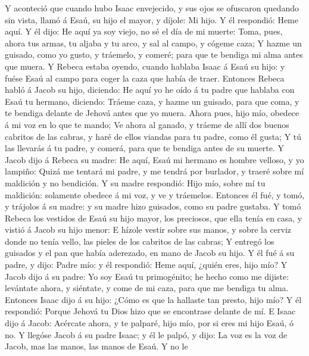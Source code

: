  Y aconteció que cuando hubo Isaac envejecido, y sus ojos se
ofuscaron quedando sin vista, llamó á Esaú, su hijo el mayor, y díjole:
Mi hijo. Y él respondió: Heme aquí.  Y él dijo: He aquí ya
soy viejo, no sé el día de mi muerte:  Toma, pues, ahora tus
armas, tu aljaba y tu arco, y sal al campo, y cógeme caza; 
Y hazme un guisado, como yo gusto, y tráemelo, y comeré; para que te
bendiga mi alma antes que muera.  Y Rebeca estaba oyendo,
cuando hablaba Isaac á Esaú su hijo: y fuése Esaú al campo para coger la
caza que había de traer.  Entonces Rebeca habló á Jacob su
hijo, diciendo: He aquí yo he oído á tu padre que hablaba con Esaú tu
hermano, diciendo:  Tráeme caza, y hazme un guisado, para
que coma, y te bendiga delante de Jehová antes que yo muera.
 Ahora pues, hijo mío, obedece á mi voz en lo que te mando;
 Ve ahora al ganado, y tráeme de allí dos buenos cabritos de
las cabras, y haré de ellos viandas para tu padre, como él gusta;
 Y tú las llevarás á tu padre, y comerá, para que te
bendiga antes de su muerte.  Y Jacob dijo á Rebeca su
madre: He aquí, Esaú mi hermano es hombre velloso, y yo lampiño:
 Quizá me tentará mi padre, y me tendrá por burlador, y
traeré sobre mí maldición y no bendición.  Y su madre
respondió: Hijo mío, sobre mí tu maldición: solamente obedece á mi voz,
y ve y tráemelos.  Entonces él fué, y tomó, y trájolos á su
madre: y su madre hizo guisados, como su padre gustaba.  Y
tomó Rebeca los vestidos de Esaú su hijo mayor, los preciosos, que ella
tenía en casa, y vistió á Jacob su hijo menor:  E hízole
vestir sobre sus manos, y sobre la cerviz donde no tenía vello, las
pieles de los cabritos de las cabras;  Y entregó los
guisados y el pan que había aderezado, en mano de Jacob su hijo.
 Y él fué á su padre, y dijo: Padre mío: y él respondió:
Heme aquí, ¿quién eres, hijo mío?  Y Jacob dijo á su padre:
Yo soy Esaú tu primogénito; he hecho como me dijiste: levántate ahora, y
siéntate, y come de mi caza, para que me bendiga tu alma. 
Entonces Isaac dijo á su hijo: ¿Cómo es que la hallaste tan presto, hijo
mío? Y él respondió: Porque Jehová tu Dios hizo que se encontrase
delante de mí.  E Isaac dijo á Jacob: Acércate ahora, y te
palparé, hijo mío, por si eres mi hijo Esaú, ó no.  Y
llegóse Jacob á su padre Isaac; y él le palpó, y dijo: La voz es la voz
de Jacob, mas las manos, las manos de Esaú.  Y no le
